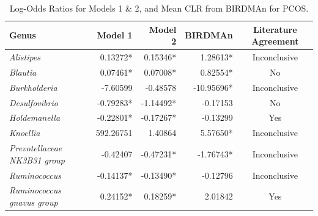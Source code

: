 \documentclass[12pt,letterpaper]{article}
\begin{document}
      \begin{table}
        \centering
        \begin{tabular}{l r r r c}
          \toprule
          \textbf{Genus} & \textbf{Model 1} & \textbf{Model 2} & \textbf{BIRDMAn} & \textbf{Literature Agreement} \\
          \midrule
          \textit{Alistipes} & 0.13272* & 0.15346* & 1.28613* & Inconclusive \\
          \textit{Blautia} & 0.07461* & 0.07008* & 0.82554* & No \\
          \textit{Burkholderia} & -7.60599 & -0.48578 & -10.95696* & Inconclusive \\
          \textit{Desulfovibrio} & -0.79283* & -1.14492* & -0.17153 & No \\
          \textit{Holdemanella} & -0.22801* & -0.17267* & -0.13299 & Yes \\
          \textit{Knoellia} & 592.26751 & 1.40864 & 5.57650* & Inconclusive \\
          \textit{Prevotellaceae NK3B31 group} & -0.42407 & -0.47231* & -1.76743* & Inconclusive \\
          \textit{Ruminococcus} & -0.14137* & -0.13490* & -0.12796 & Inconclusive \\
          \textit{Ruminococcus gnavus group} & 0.24152* & 0.18259* & 2.01842 & Yes \\
          \bottomrule
        \end{tabular}
        \caption{Log-Odds Ratios for Models 1 \& 2, and Mean CLR from BIRDMAn for PCOS.}
        \label{table:pcosresults}
      \end{table}
      
\end{document}
